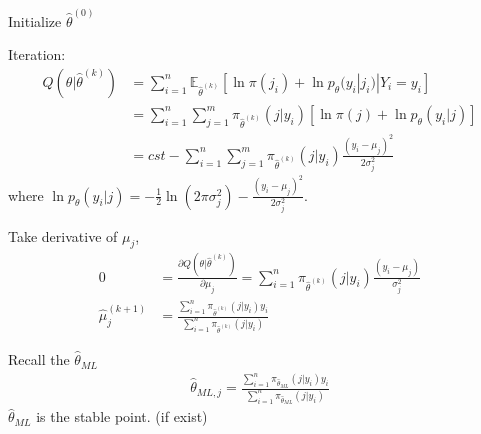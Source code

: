 \documentclass[11pt,a4paper]{article}
\begin{document}
Initialize $\hat{\theta}^{(0)}$

Iteration:
\begin{equation}
    \begin{aligned}
        Q(\theta|\hat{\theta}^{(k)})
        &=\sum_{i=1}^n\mathbb{E}_{\hat{\theta}^{(k)}}[\ln \pi(j_i)+\ln p_{\theta}(y_i|j_i)|Y_i=y_i]\\
        &=\sum_{i=1}^n\sum_{j=1}^m\pi_{\hat{\theta}^{(k)}}(j|y_i)[\ln \pi(j)+\ln p_{\theta}(y_i|j)]\\
        &=cst-\sum_{i=1}^n\sum_{j=1}^m\pi_{\hat{\theta}^{(k)}}(j|y_i)\frac{(y_i-\mu_j)^2}{2\sigma_j^2}
    \end{aligned}
    \nonumber
\end{equation}
where $\ln p_{\theta}(y_i|j)=-\frac{1}{2}\ln(2\pi\sigma_j^2)-\frac{(y_i-\mu_j)^2}{2\sigma_j^2}$.

Take derivative of $\mu_j$,
\begin{equation}
    \begin{aligned}
        0&=\frac{\partial Q(\theta|\hat{\theta}^{(k)})}{\partial \mu_j}=\sum_{i=1}^n\pi_{\hat{\theta}^{(k)}}(j|y_i)\frac{(y_i-\mu_j)}{\sigma_j^2}\\
        \hat{\mu}_j^{(k+1)}&=\frac{\sum_{i=1}^n\pi_{\hat{\theta}^{(k)}}(j|y_i)y_i}{\sum_{i=1}^n\pi_{\hat{\theta}^{(k)}}(j|y_i)}
    \end{aligned}
    \nonumber
\end{equation}

Recall the $\hat{\theta}_{ML}$
\begin{equation}
    \begin{aligned}
        \hat{\theta}_{ML,j}=\frac{\sum_{i=1}^n\pi_{\hat{\theta}_{ML}}(j|y_i)y_i}{\sum_{i=1}^n\pi_{\hat{\theta}_{ML}}(j|y_i)}
    \end{aligned}
    \nonumber
\end{equation}
$\hat{\theta}_{ML}$ is the stable point. (if exist)
\end{document}
